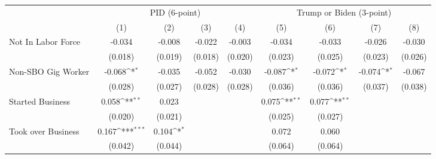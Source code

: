 {
\def\sym#1{\ifmmode^{#1}\else\(^{#1}\)\fi}
\begin{tabular}{l*{8}{c}}
\hline\hline
                    &\multicolumn{4}{c}{PID (6-point)}                                                      &\multicolumn{4}{c}{Trump or Biden (3-point)}                                           \\
                    &\multicolumn{1}{c}{(1)}         &\multicolumn{1}{c}{(2)}         &\multicolumn{1}{c}{(3)}         &\multicolumn{1}{c}{(4)}         &\multicolumn{1}{c}{(5)}         &\multicolumn{1}{c}{(6)}         &\multicolumn{1}{c}{(7)}         &\multicolumn{1}{c}{(8)}         \\
\hline
Not In Labor Force  &      -0.034         &      -0.008         &      -0.022         &      -0.003         &      -0.034         &      -0.033         &      -0.026         &      -0.030         \\
                    &     (0.018)         &     (0.019)         &     (0.018)         &     (0.020)         &     (0.023)         &     (0.025)         &     (0.023)         &     (0.026)         \\
Non-SBO Gig Worker  &      -0.068\sym{*}  &      -0.035         &      -0.052         &      -0.030         &      -0.087\sym{*}  &      -0.072\sym{*}  &      -0.074\sym{*}  &      -0.067         \\
                    &     (0.028)         &     (0.027)         &     (0.028)         &     (0.028)         &     (0.036)         &     (0.036)         &     (0.037)         &     (0.038)         \\
Started Business    &       0.058\sym{**} &       0.023         &                     &                     &       0.075\sym{**} &       0.077\sym{**} &                     &                     \\
                    &     (0.020)         &     (0.021)         &                     &                     &     (0.025)         &     (0.027)         &                     &                     \\
Took over Business  &       0.167\sym{***}&       0.104\sym{*}  &                     &                     &       0.072         &       0.060         &                     &                     \\
                    &     (0.042)         &     (0.044)         &                     &                     &     (0.064)         &     (0.064)         &                     &                     \\

\end{tabular}}
